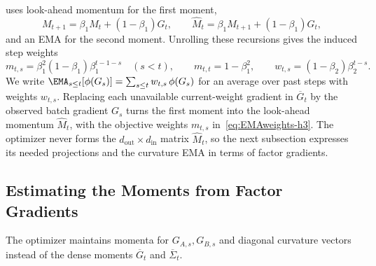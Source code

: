  uses look-ahead momentum for the first moment,
\[
  M_{t+1}=\beta_1M_t+(1-\beta_1)G_t,
  \qquad
  \widehat M_t=\beta_1M_{t+1}+(1-\beta_1)G_t,
\]
and an EMA for the second moment. Unrolling these recursions
gives the induced step weights
\begin{equation}\label{eq:EMAweights-h3}
  m_{t,s}=\beta_1^2(1-\beta_1)\beta_1^{t-1-s}
  \quad(s<t),
  \qquad
  m_{t,t}=1-\beta_1^2,
  \qquad
  w_{t,s}=(1-\beta_2)\beta_2^{t-s}.
\end{equation}
We write $\EMA_{s\le t}[\phi(G_s)]=\sum_{s\le t}w_{t,s}\,\phi(G_s)$ for an
average over past steps with weights $w_{t,s}$. Replacing each unavailable
current-weight gradient in $\overline G_t$ by the observed batch gradient
$G_s$ turns the first moment into the look-ahead momentum $\widehat M_t$,
with the objective weights $m_{t,s}$ in~\eqref{eq:EMAweights-h3}. The
optimizer never forms the $d_{\mathrm{out}}\times d_{\mathrm{in}}$ matrix
$\widehat M_t$, so the next subsection expresses its needed projections and
the curvature EMA in terms of factor gradients.

\subsection{Estimating the Moments from Factor Gradients}
\label{sec:weighted-estimation-h3}

The optimizer maintains momenta for $G_{A,s},G_{B,s}$ and diagonal
curvature vectors instead of the dense moments $\overline G_t$ and
$\overline\Sigma_t$.

